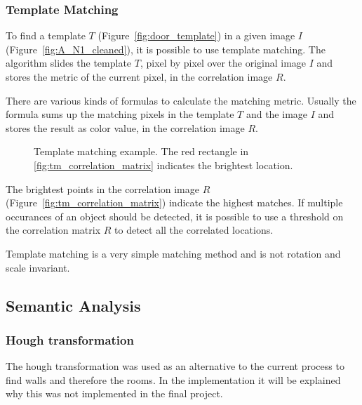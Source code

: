 \subsubsection{Template Matching}
To find a template $T$ (Figure~\ref{fig:door_template}) in a given image $I$ (Figure~\ref{fig:A_N1_cleaned}), it is possible to use template matching. The algorithm slides the template $T$, pixel by pixel over the original image $I$ and stores the metric of the current pixel, in the correlation image $R$.

There are various kinds of formulas to calculate the matching metric. Usually the formula sums up the matching pixels in the template $T$ and the image $I$ and stores the result as color value, in the correlation image $R$.

\begin{figure}[h!]
	\centering
	\hfill
	\hfill
	\caption{Template matching example. The red rectangle in \ref{fig:tm_correlation_matrix} indicates the brightest location.}
	\label{fig:TemplateMatchingExample}
\end{figure}


The brightest points in the correlation image $R$ (Figure~\ref{fig:tm_correlation_matrix})  indicate the highest matches. If multiple occurances of an object should be detected, it is possible to use a threshold on the correlation matrix $R$ to detect all the correlated locations.

Template matching is a very simple matching method and is not rotation and scale invariant.



 
\subsection{Semantic Analysis}
\subsubsection{Hough transformation}
\label{subsubsec:Hough transformation}
The hough transformation was used as an alternative to the current process to find walls and therefore the rooms. In the implementation it will be explained why this was not implemented in the final project.

